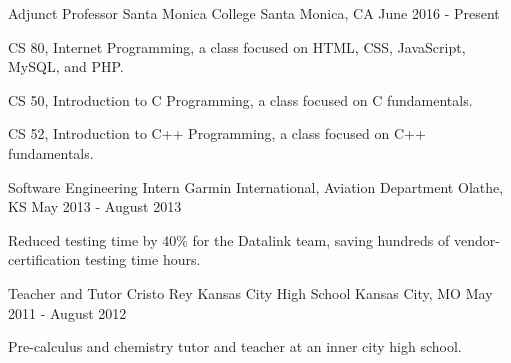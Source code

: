 


\begin{cventries}


\cventry
{Adjunct Professor}
{Santa Monica College}
{Santa Monica, CA}
{June 2016 - Present}
{
\begin{cvitems}
\item CS 80, Internet Programming, a class focused on HTML, CSS, JavaScript, MySQL, and PHP.
\item CS 50, Introduction to C Programming, a class focused on C fundamentals.
\item CS 52, Introduction to C++ Programming, a class focused on C++ fundamentals.
\end{cvitems}
}


\cventry
{Software Engineering Intern}
{Garmin International, Aviation Department}
{Olathe, KS}
{May 2013 - August 2013}
{
\begin{cvitems}
\item Reduced testing time by 40\% for the Datalink team, saving hundreds of vendor-certification testing time hours.
\end{cvitems}
}


\cventry
{Teacher and Tutor}
{Cristo Rey Kansas City High School}
{Kansas City, MO}
{May 2011 - August 2012}
{
\begin{cvitems}
\item Pre-calculus and chemistry tutor and teacher at an inner city high school.
\end{cvitems}
}

\end{cventries}